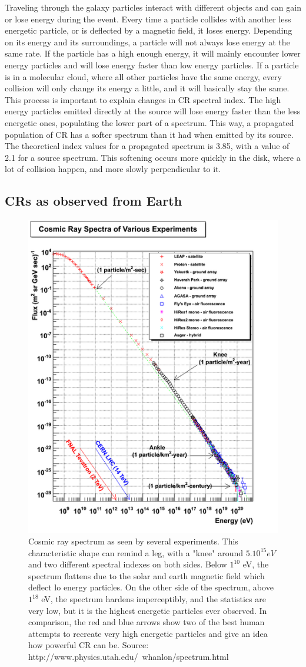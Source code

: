 Traveling through the galaxy particles interact with different objects and can gain or lose energy during the event. Every time a particle collides with another less energetic particle, or is deflected by a magnetic field, it loses energy. Depending on its energy and its surroundings, a particle will not always lose energy at the same rate.
If the particle has a high enough energy, it will mainly encounter lower energy particles and will lose energy faster than low energy particles. If a particle is in a molecular cloud, where all other particles have the same energy, every collision will only change its energy a little, and it will basically stay the same.
This process is important to explain changes in CR spectral index. The high energy particles emitted directly at the source will lose energy faster than the less energetic ones, populating the lower part of a spectrum. This way, a propagated population of CR has a softer spectrum than it had when emitted by its source. The theoretical index values for a propagated spectrum is 3.85, with a value of 2.1 for a source spectrum. 
This softening occurs more quickly in the disk, where a lot of collision happen, and more slowly perpendicular to it.



\subsection{CRs as observed from Earth}

\begin{figure}[h]
 \centering
 \includegraphics[width=.5\linewidth]{pic/theory/CR_spectrum.png}
 \caption{Cosmic ray spectrum as seen by several experiments. This characteristic shape can remind a leg, with a "knee" around $5.10^{15} eV$ and two different spectral indexes on both sides. Below $1^{10}$ eV, the spectrum flattens due to the solar and earth magnetic field which deflect lo energy particles. On the other side of the spectrum, above $1^{18}$ eV, the spectrum hardens imperceptibly, and the statistics are very low, but it is the highest energetic particles ever observed. In comparison, the red and blue arrows show two of the best human attempts to recreate very high energetic particles and give an idea how powerful CR can be. Source: http://www.physics.utah.edu/~whanlon/spectrum.html}
 \label{fig:CR_spectrum}
\end{figure}

